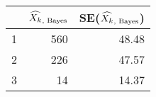 \begin{table}[ht]
\centering
\begin{tabular}{rrr}
  \hline
 & $\widehat{X_k}_\text{, Bayes}$ & SE($\widehat{X_k}_\text{, Bayes}$) \\ 
  \hline
1 & 560 & 48.48 \\ 
  2 & 226 & 47.57 \\ 
  3 & 14 & 14.37 \\ 
   \hline
\end{tabular}
\end{table}
